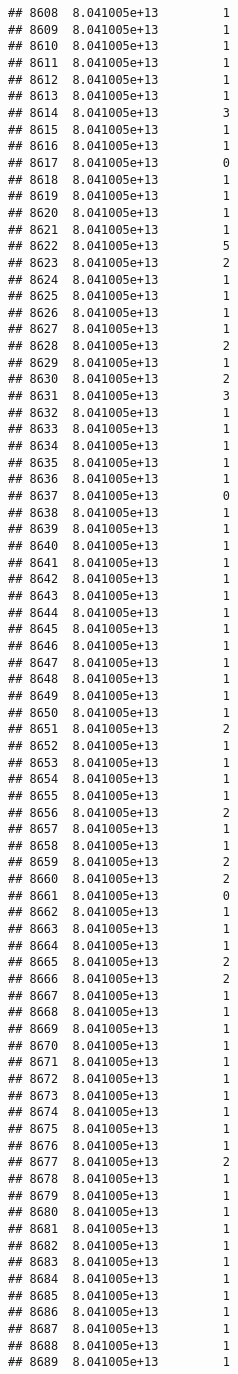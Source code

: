 \documentclass[
]{article}
\begin{document}
\begin{verbatim}
## 8608  8.041005e+13         1
## 8609  8.041005e+13         1
## 8610  8.041005e+13         1
## 8611  8.041005e+13         1
## 8612  8.041005e+13         1
## 8613  8.041005e+13         1
## 8614  8.041005e+13         3
## 8615  8.041005e+13         1
## 8616  8.041005e+13         1
## 8617  8.041005e+13         0
## 8618  8.041005e+13         1
## 8619  8.041005e+13         1
## 8620  8.041005e+13         1
## 8621  8.041005e+13         1
## 8622  8.041005e+13         5
## 8623  8.041005e+13         2
## 8624  8.041005e+13         1
## 8625  8.041005e+13         1
## 8626  8.041005e+13         1
## 8627  8.041005e+13         1
## 8628  8.041005e+13         2
## 8629  8.041005e+13         1
## 8630  8.041005e+13         2
## 8631  8.041005e+13         3
## 8632  8.041005e+13         1
## 8633  8.041005e+13         1
## 8634  8.041005e+13         1
## 8635  8.041005e+13         1
## 8636  8.041005e+13         1
## 8637  8.041005e+13         0
## 8638  8.041005e+13         1
## 8639  8.041005e+13         1
## 8640  8.041005e+13         1
## 8641  8.041005e+13         1
## 8642  8.041005e+13         1
## 8643  8.041005e+13         1
## 8644  8.041005e+13         1
## 8645  8.041005e+13         1
## 8646  8.041005e+13         1
## 8647  8.041005e+13         1
## 8648  8.041005e+13         1
## 8649  8.041005e+13         1
## 8650  8.041005e+13         1
## 8651  8.041005e+13         2
## 8652  8.041005e+13         1
## 8653  8.041005e+13         1
## 8654  8.041005e+13         1
## 8655  8.041005e+13         1
## 8656  8.041005e+13         2
## 8657  8.041005e+13         1
## 8658  8.041005e+13         1
## 8659  8.041005e+13         2
## 8660  8.041005e+13         2
## 8661  8.041005e+13         0
## 8662  8.041005e+13         1
## 8663  8.041005e+13         1
## 8664  8.041005e+13         1
## 8665  8.041005e+13         2
## 8666  8.041005e+13         2
## 8667  8.041005e+13         1
## 8668  8.041005e+13         1
## 8669  8.041005e+13         1
## 8670  8.041005e+13         1
## 8671  8.041005e+13         1
## 8672  8.041005e+13         1
## 8673  8.041005e+13         1
## 8674  8.041005e+13         1
## 8675  8.041005e+13         1
## 8676  8.041005e+13         1
## 8677  8.041005e+13         2
## 8678  8.041005e+13         1
## 8679  8.041005e+13         1
## 8680  8.041005e+13         1
## 8681  8.041005e+13         1
## 8682  8.041005e+13         1
## 8683  8.041005e+13         1
## 8684  8.041005e+13         1
## 8685  8.041005e+13         1
## 8686  8.041005e+13         1
## 8687  8.041005e+13         1
## 8688  8.041005e+13         1
## 8689  8.041005e+13         1

\end{verbatim}
\end{document}
